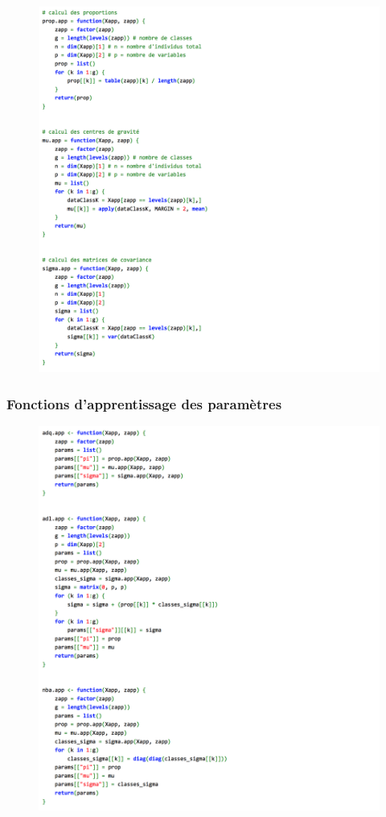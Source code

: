 \documentclass[a4paper,10pt]{report}
\begin{document}
\begin{figure}[H]
	\centering
	\captionsetup{justification=centering, margin=3cm}
	\includegraphics[width=0.9\linewidth]{img/A-anadisc-sub-functions}
	\label{fig:A-1-anadisc-sub-functions}
\end{figure}

\subsubsection{Fonctions d'apprentissage des paramètres}

\begin{figure}[H]
	\centering
	\captionsetup{justification=centering, margin=3cm}
	\includegraphics[width=0.9\linewidth]{img/A-anadisc-app-functions}
	\label{fig:A-1-anadisc-app-functions}
\end{figure}
\end{document}
